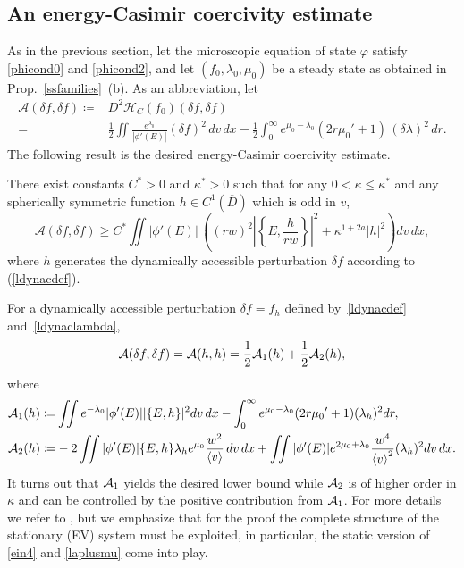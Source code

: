 \documentclass[11pt]{article}
\begin{document}
\subsection{An energy-Casimir coercivity estimate}
\label{coerc_ec_ev}
%
As in the previous section, let the microscopic equation of state
$\varphi$ satisfy \eqref{phicond0} and \eqref{phicond2}, and let
$(f_0,\lambda_0,\mu_0)$ be a steady state
as obtained in Prop.~\ref{ssfamilies}~(b).
As an abbreviation, let
\begin{align*}
  \mathcal{A}(\delta f,\delta f)
  \coloneqq&
  D^2\mathcal{H}_C(f_0)(\delta f,\delta f) \\
  =&
  \frac{1}{2}\iint \frac{e^{\lambda_0}}{|\phi'(E)|}(\delta f)^2\,dv\,dx
  - \frac{1}{2}\int_0^\infty e^{\mu_0 - \lambda_0}
  \left(2 r \mu_0' +1\right)\, (\delta\lambda)^2\,dr.
\end{align*}
The following result is the desired
energy-Casimir coercivity estimate.
%
%
\begin{theorem}\label{th:coercivity}
  There exist constants $C^\ast >0$ and $\kappa^\ast>0$ such that
  for any $0<\kappa\leq\kappa^\ast$ and any
  spherically symmetric function $h\in C^1(\overline{D})$ 
  which is odd in $v$,
  \[
  \mathcal{A}(\delta f,\delta f)\geq 
  C^\ast\iint|\phi'(E)|\,\left((rw)^2 
  \left|\left\{E,\frac{h}{rw}\right\}\right|^2 
  + \kappa^{1+2a} |h|^2\right) dv\,dx,
  \]
  where $h$ generates the dynamically accessible perturbation
  $\delta f$ according to (\ref{ldynacdef}).
\end{theorem}
%
%
For a dynamically accessible 
perturbation $\delta f=f_h$ defined by~\eqref{ldynacdef}
and~\eqref{ldynaclambda}, 
\[
{\cal A}(\delta f,\delta f)={\cal A}(h,h)=
\frac{1}{2} {\cal A}_{1}(h)+\frac{1}{2}{\cal A}_{2}(h),
\]
where 
\begin{align*}
  {\cal A}_{1}(h)
  \coloneqq&
  \iint e^{-\lambda_0}|\phi'(E)||\{E,h\}|^2 dv\,dx
  -\int_0^{\infty}e^{\mu_0-\lambda_0}
  (2r{\mu_0}'+1)(\lambda_h)^2 dr,\\
  {\cal A}_{2}(h)
  \coloneqq&
  -2 \iint |\phi'(E)|\{E,h\} 
  \lambda_h e^{\mu_0}\frac{w^2}{\left\langle v\right\rangle}\,dv\,dx
  + \iint|\phi'(E)|e^{2\mu_0+\lambda_0}\frac{w^4}{\left\langle v\right\rangle^2}(\lambda_h)^2
  dv\,dx .
\end{align*}
It turns out that ${\cal A}_{1}$ yields the desired
lower bound while ${\cal A}_{2}$ is of higher order in $\kappa$ and can
be controlled by the positive contribution from ${\cal A}_{1}$.
For more details we refer to \cite[Theorem~5.1]{HaRe2014}, but we
emphasize that for the proof the complete structure of the
stationary (EV) system must be exploited, in particular, the
static version of \eqref{ein4} and \eqref{laplusmu} come into play.
\end{document}
